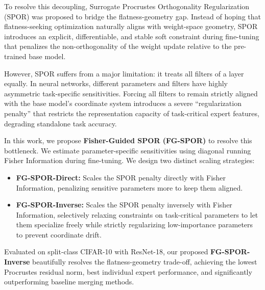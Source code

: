 \documentclass{article}
\theoremstyle{plain}
\theoremstyle{definition}
\theoremstyle{remark}
\begin{document}
To resolve this decoupling, Surrogate Procrustes Orthogonality Regularization (SPOR) \cite{spor2026} was proposed to bridge the flatness-geometry gap. Instead of hoping that flatness-seeking optimization naturally aligns with weight-space geometry, SPOR introduces an explicit, differentiable, and stable soft constraint during fine-tuning that penalizes the non-orthogonality of the weight update relative to the pre-trained base model. 

However, SPOR suffers from a major limitation: it treats all filters of a layer equally. In neural networks, different parameters and filters have highly asymmetric task-specific sensitivities. Forcing all filters to remain strictly aligned with the base model's coordinate system introduces a severe ``regularization penalty'' that restricts the representation capacity of task-critical expert features, degrading standalone task accuracy.

In this work, we propose \textbf{Fisher-Guided SPOR (FG-SPOR)} to resolve this bottleneck. We estimate parameter-specific sensitivities using diagonal running Fisher Information during fine-tuning. We design two distinct scaling strategies:
\begin{itemize}
    \item \textbf{FG-SPOR-Direct:} Scales the SPOR penalty directly with Fisher Information, penalizing sensitive parameters more to keep them aligned.
    \item \textbf{FG-SPOR-Inverse:} Scales the SPOR penalty inversely with Fisher Information, selectively relaxing constraints on task-critical parameters to let them specialize freely while strictly regularizing low-importance parameters to prevent coordinate drift.
\end{itemize}

Evaluated on split-class CIFAR-10 with ResNet-18, our proposed \textbf{FG-SPOR-Inverse} beautifully resolves the flatness-geometry trade-off, achieving the lowest Procrustes residual norm, best individual expert performance, and significantly outperforming baseline merging methods.
\end{document}
